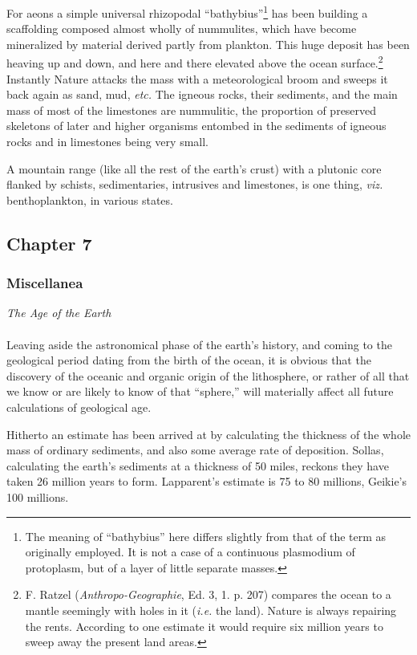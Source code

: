 \documentclass[a4paper, 12pt, oneside]{article}
\begin{document}
For aeons a simple universal rhizopodal ``bathybius''\footnote{The meaning of ``bathybius'' here differs slightly from that of the term as originally employed. It is not a case of a continuous plasmodium of protoplasm, but of a layer of little separate masses.} has been building a scaffolding composed almost wholly of nummulites, which have become mineralized by material derived partly from plankton. This huge deposit has been heaving up and down, and here and there elevated above the ocean surface.\footnote{F. Ratzel (\emph{Anthropo-Geographie}, Ed. 3, 1. p. 207) compares the ocean to a mantle seemingly with holes in it (\emph{i.e.} the land). Nature is always repairing the rents. According to one estimate it would require six million years to sweep away the present land areas.} Instantly Nature attacks the mass with a meteorological broom and sweeps it back again as sand, mud, \emph{etc.} The igneous rocks, their sediments, and the main mass of most of the limestones are nummulitic, the proportion of preserved skeletons of later and higher organisms entombed in the sediments of igneous rocks and in limestones being very small.

A mountain range (like all the rest of the earth's crust) with a plutonic core flanked by schists, sedimentaries, intrusives and limestones, is one thing, \emph{viz.} benthoplankton, in various states.
\clearpage
\subsection{Chapter 7}
\subsubsection{Miscellanea}
\centerline{\emph{The Age of the Earth}}
\paragraph{}
Leaving aside the astronomical phase of the earth's history, and coming to the geological period dating from the birth of the ocean, it is obvious that the discovery of the oceanic and organic origin of the lithosphere, or rather of all that we know or are likely to know of that ``sphere,'' will materially affect all future calculations of geological age.

Hitherto an estimate has been arrived at by calculating the thickness of the whole mass of ordinary sediments, and also some average rate of deposition. Sollas, calculating the earth's sediments at a thickness of 50 miles, reckons they have taken 26 million years to form. Lapparent's estimate is 75 to 80 millions, Geikie's 100 millions.
\end{document}
